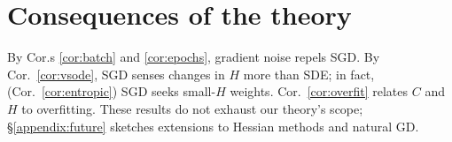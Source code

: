 \documentclass[anon,12pt]{colt2021} %
\begin{document}
{            \newpage
    \section{Consequences of the theory}\label{sect:consequences}

        By Cor.s \ref{cor:batch} and \ref{cor:epochs}, gradient noise repels SGD.
        By Cor.\ \ref{cor:vsode}, SGD senses changes in $H$ more than
            SDE; in fact, (Cor.\ \ref{cor:entropic}) SGD seeks small-$H$
            weights.
        Cor.\ \ref{cor:overfit} relates
            $C$ and $H$ to overfitting.  These
            results do not exhaust our theory's scope;
            \S\ref{appendix:future} sketches 
            extensions to Hessian methods and natural GD.

}
\end{document}
